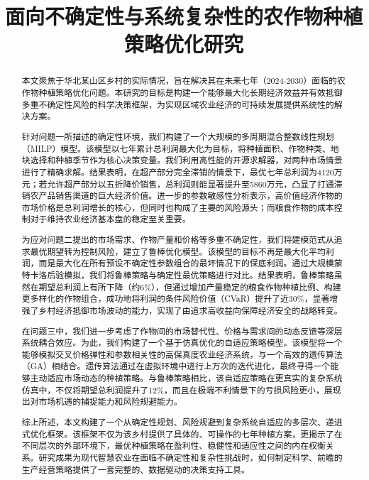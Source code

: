 \documentclass[withoutpreface,bwprint]{cumcmthesis} %
\title{面向不确定性与系统复杂性的农作物种植策略优化研究
}
\begin{document}
\maketitle
\begin{abstract}

本文聚焦于华北某山区乡村的实际情况，旨在解决其在未来七年（2024-2030）面临的农作物种植策略优化问题。本研究的目标是构建一个能够最大化长期经济效益并有效抵御多重不确定性风险的科学决策框架，为实现区域农业经济的可持续发展提供系统性的解决方案。

针对问题一所描述的确定性环境，我们构建了一个大规模的多周期混合整数线性规划（MILP）模型。该模型以七年累计总利润最大化为目标，将种植面积、作物种类、地块选择和种植季节作为核心决策变量。我们利用高性能的开源求解器，对两种市场情景进行了精确求解。结果表明，在超产部分完全滞销的情景下，最优七年总利润为4120万元；若允许超产部分以五折降价销售，总利润则能显著提升至5860万元，凸显了打通滞销农产品销售渠道的巨大经济价值。进一步的参数敏感性分析表示，高价值经济作物的市场价格是总利润增长的核心，但同时也构成了主要的风险源头；而粮食作物的成本控制对于维持农业经济基本盘的稳定至关重要。

为应对问题二提出的市场需求、作物产量和价格等多重不确定性，我们将建模范式从追求最优期望转为控制风险，建立了鲁棒优化模型。该模型的目标不再是最大化平均利润，而是最大化在所有预设不确定性参数组合的最坏情况下的保底利润。通过大规模蒙特卡洛后验模拟，我们将鲁棒策略与确定性最优策略进行对比。结果表明，鲁棒策略虽然在期望总利润上有所下降（约6\%），但通过增加产量稳定的粮食作物种植比例、构建更多样化的作物组合，成功地将利润的条件风险价值（CVaR）提升了近30\%，显著增强了乡村经济抵御市场波动的能力，实现了由追求高收益向保障经济安全的战略转变。

在问题三中，我们进一步考虑了作物间的市场替代性、价格与需求间的动态反馈等深层系统耦合效应。为此，我们构建了一个基于仿真优化的自适应策略模型。该模型将一个能够模拟交叉价格弹性和参数相关性的高保真度农业经济系统，与一个高效的遗传算法（GA）相结合。遗传算法通过在虚拟环境中进行上万次的迭代进化，最终寻得一个能够主动适应市场动态的种植策略。与鲁棒策略相比，该自适应策略在更真实的复杂系统仿真中，不仅将期望总利润提升了12\%，而且在极端不利情景下的亏损风险更小，展现出对市场机遇的捕捉能力和风险规避能力。

综上所述，本文构建了一个从确定性规划、风险规避到复杂系统自适应的多层次、递进式优化框架。该框架不仅为该乡村提供了具体的、可操作的七年种植方案，更揭示了在不同层次的外部环境下，最优种植策略在盈利性、稳健性和适应性之间的内在权衡关系。研究成果为现代智慧农业在面临不确定性和复杂性挑战时，如何制定科学、前瞻的生产经营策略提供了一套完整的、数据驱动的决策支持工具。


\end{abstract}
\end{document}
